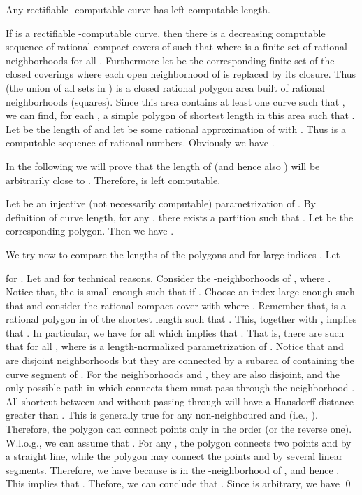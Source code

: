 \documentclass{LMCS}
\theoremstyle{plain}
\begin{document}
\begin{thm}\label{thm-lc-length-K}
Any rectifiable -computable curve has left computable length.
\end{thm}
\proof If  is a rectifiable -computable curve, then there is a decreasing computable sequence  of rational compact covers of  such that  where  is a finite set of rational neighborhoods for all . Furthermore let  be the corresponding finite set of the closed coverings where each open neighborhood of  is replaced by its closure. Thus  (the union of all sets in ) is a closed rational polygon area built of rational neighborhoods (squares). Since this area contains at least one curve  such that , we can find, for each , a simple polygon  of shortest length in this area such that .
Let  be the length of  and let  be some rational approximation of  with . Thus  is a computable sequence of rational numbers. Obviously we have .

In the following we will prove that the length  of  (and hence also ) will be  arbitrarily close to . Therefore,  is left computable.

Let  be an injective (not necessarily computable) parametrization of . By definition of curve length, for any , there exists a partition  such that . Let  be the corresponding polygon. Then we have .

We try now to compare the lengths of the polygons  and  for large indices . Let

for . Let  and  for technical reasons. Consider the -neighborhoods   of , where . Notice that, the  is small enough such that   if .  Choose an index  large enough such that  and consider the rational compact cover  with  where . Remember that,  is a rational polygon in  of the shortest length such that . This, together with , implies that . In particular, we have  for all  which implies that . That is, there are  such that  for all , where  is a length-normalized parametrization of . Notice that  and  are disjoint neighborhoods but they are connected by a  subarea of  containing the curve segment  of . For the neighborhoods  and , they are also disjoint, and the only possible path in  which connects them must pass through the neighborhood . All shortcut between  and  without passing through  will have a Hausdorff distance greater than . This is generally true for any non-neighboured   and  (i.e., ). Therefore, the polygon  can connect points  only in the order  (or the reverse one). W.l.o.g., we can assume that . For any , the polygon  connects two points  and  by a straight line, while the polygon  may connect the points  and  by several linear segments. Therefore, we have  because  is in the -neighborhood  of ,  and hence . This implies that . Thefore, we can conclude that . Since  is arbitrary, we have 
\qed
\end{document}
